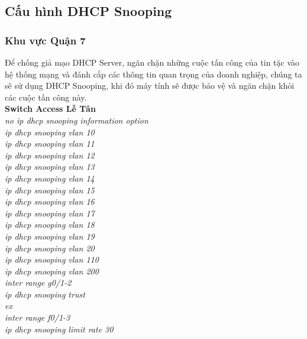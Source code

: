 \documentclass[12pt,a4paper]{report}
\begin{document}
\subsection{Cấu hình DHCP Snooping}
\subsubsection{Khu vực Quận 7}
\hspace*{0.25cm}Để chống giả mạo DHCP Server, ngăn chặn những cuộc tấn công của tin tặc vào hệ thống mạng và đánh cắp các thông tin quan trọng của doanh nghiệp, chúng ta sẽ sử dụng DHCP Snooping, khi đó máy tính sẽ được bảo vệ và ngăn chặn khỏi các cuộc tấn công này.\\
\hspace*{1cm}\textbf{Switch Access Lễ Tân}\\
\hspace*{2cm}\textit{no ip dhcp snooping information option\\
\hspace*{2cm}ip dhcp snooping vlan 10\\
\hspace*{2cm}ip dhcp snooping vlan 11\\
\hspace*{2cm}ip dhcp snooping vlan 12\\
\hspace*{2cm}ip dhcp snooping vlan 13\\
\hspace*{2cm}ip dhcp snooping vlan 14\\
\hspace*{2cm}ip dhcp snooping vlan 15\\
\hspace*{2cm}ip dhcp snooping vlan 16\\
\hspace*{2cm}ip dhcp snooping vlan 17\\
\hspace*{2cm}ip dhcp snooping vlan 18\\
\hspace*{2cm}ip dhcp snooping vlan 19\\
\hspace*{2cm}ip dhcp snooping vlan 20\\
\hspace*{2cm}ip dhcp snooping vlan 110\\
\hspace*{2cm}ip dhcp snooping vlan 200\\
\hspace*{2cm}inter range g0/1-2\\
\hspace*{2cm}ip dhcp snooping trust\\
\hspace*{2cm}ex\\
\hspace*{2cm}inter range f0/1-3\\
\hspace*{2cm}ip dhcp snooping limit rate 30\\}
\end{document}
